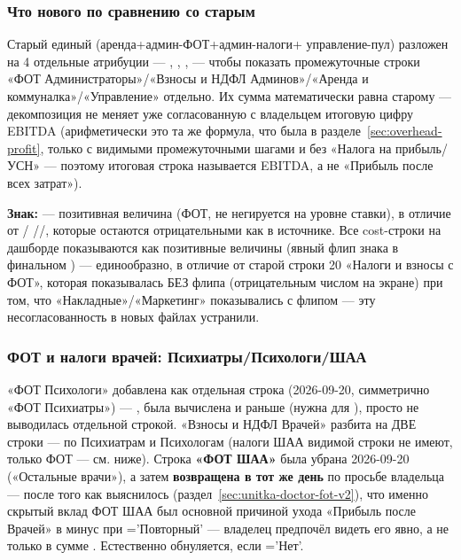 \documentclass[11pt,a4paper]{article}
\newcommand{\code}[1]{\texttt{\detokenize{#1}}}
\begin{document}
\subsubsection{Что нового по сравнению со старым \texttt{}}

Старый единый \texttt{} (аренда+админ-ФОТ+админ-налоги+
управление-пул) разложен на 4 отдельные атрибуции --- \texttt{},
\texttt{}, \texttt{}, \texttt{}
--- чтобы показать промежуточные строки «ФОТ Администраторы»/«Взносы и
НДФЛ Админов»/«Аренда и коммуналка»/«Управление» отдельно. Их сумма
математически равна старому \texttt{} --- декомпозиция не
меняет уже согласованную с владельцем итоговую цифру EBITDA (арифметически
это та же формула, что была в разделе~\ref{sec:overhead-profit}, только с
видимыми промежуточными шагами и без «Налога на прибыль/УСН» --- поэтому
итоговая строка называется EBITDA, а не «Прибыль после всех затрат»).

\textbf{Знак:} \texttt{} --- позитивная величина (ФОТ, не
негируется на уровне ставки), в отличие от \texttt{}/
\texttt{}/\texttt{}/\texttt{}, которые
остаются отрицательными как в источнике. Все cost-строки на дашборде
показываются как позитивные величины (явный флип знака в финальном
\code{SELECT}) --- единообразно, в отличие от старой строки 20 «Налоги и
взносы с ФОТ», которая показывалась БЕЗ флипа (отрицательным числом на
экране) при том, что «Накладные»/«Маркетинг» показывались с флипом ---
эту несогласованность в новых файлах устранили.

\subsubsection{ФОТ и налоги врачей: Психиатры/Психологи/ШАА}
\label{sec:unitka-doctor-taxes}

«ФОТ Психологи» добавлена как отдельная строка (2026-09-20, симметрично
«ФОТ Психиатры») --- \texttt{}, была вычислена и раньше
(нужна для \texttt{}), просто не выводилась отдельной строкой.
«Взносы и НДФЛ Врачей» разбита на ДВЕ строки --- по Психиатрам и
Психологам (налоги ШАА видимой строки не имеют, только ФОТ --- см.
ниже). Строка \textbf{«ФОТ ШАА»} была убрана 2026-09-20 («Остальные
врачи»), а затем \textbf{возвращена в тот же день} по просьбе
владельца --- после того как выяснилось (раздел~\ref{sec:unitka-doctor-fot-v2}),
что именно скрытый вклад ФОТ ШАА был основной причиной ухода
«Прибыль после Врачей» в минус при \texttt{}='Повторный' ---
владелец предпочёл видеть его явно, а не только в сумме
\texttt{}. Естественно обнуляется, если
\texttt{}='Нет'.
\end{document}
